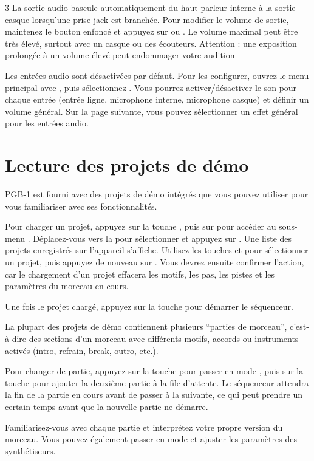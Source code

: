 \documentclass[8pt]{extarticle}
\def\device{PGB-1 }
\begin{document}
\begin{multicols*}{3}
La sortie audio bascule automatiquement du haut-parleur interne à la sortie casque lorsqu'une prise jack est branchée. Pour modifier le volume de sortie, maintenez le bouton
 enfoncé et appuyez sur  ou . Le volume maximal peut être très élevé, surtout avec un casque ou des écouteurs. Attention : une exposition prolongée à un volume élevé peut endommager votre audition

Les entrées audio sont désactivées par défaut. Pour les configurer, ouvrez le menu principal avec
, puis sélectionnez . Vous pourrez activer/désactiver le son pour chaque entrée (entrée ligne, microphone interne, microphone casque) et définir un volume général. Sur la page suivante, vous pouvez sélectionner un effet général pour les entrées audio.

\section{Lecture des projets de démo}

\device est fourni avec des projets de démo intégrés que vous pouvez utiliser pour vous familiariser avec ses fonctionnalités.

Pour charger un projet, appuyez sur la touche , puis sur  pour accéder au sous-menu . Déplacez-vous vers la  pour sélectionner  et appuyez sur . Une liste des projets enregistrés sur l'appareil s'affiche. Utilisez les touches  et  pour sélectionner un projet, puis appuyez de nouveau sur .
Vous devrez ensuite confirmer l'action, car le chargement d'un projet effacera les motifs, les pas, les pistes et les paramètres du morceau en cours.

Une fois le projet chargé, appuyez sur la touche  pour démarrer le séquenceur.

La plupart des projets de démo contiennent plusieurs “parties de morceau”, c'est-à-dire des sections d'un morceau avec différents motifs, accords ou instruments activés (intro, refrain, break, outro, etc.).

Pour changer de partie, appuyez sur la touche  pour passer en mode , puis sur la touche  pour ajouter la deuxième partie à la file d'attente. Le séquenceur attendra la fin de la partie en cours avant de passer à la suivante, ce qui peut prendre un certain temps avant que la nouvelle partie ne démarre.

Familiarisez-vous avec chaque partie et interprétez votre propre version du morceau. Vous pouvez également passer en mode  et ajuster les paramètres des synthétiseurs.


\end{multicols*}
\end{document}
